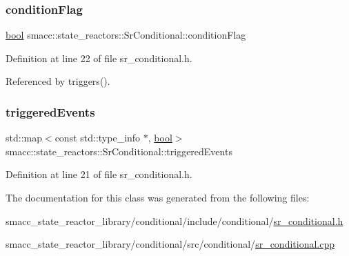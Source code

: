 \subsubsection{\texorpdfstring{condition\+Flag}{conditionFlag}}
{\footnotesize\ttfamily \hyperlink{classbool}{bool} smacc\+::state\+\_\+reactors\+::\+Sr\+Conditional\+::condition\+Flag\hspace{0.3cm}{\ttfamily [private]}}



Definition at line 22 of file sr\+\_\+conditional.\+h.



Referenced by triggers().

\mbox{\label{classsmacc_1_1state__reactors_1_1SrConditional_a6d841c624d6f6875db2ab6c6314bc3e1}} 
\subsubsection{\texorpdfstring{triggered\+Events}{triggeredEvents}}
{\footnotesize\ttfamily std\+::map$<$const std\+::type\+\_\+info $\ast$, \hyperlink{classbool}{bool}$>$ smacc\+::state\+\_\+reactors\+::\+Sr\+Conditional\+::triggered\+Events\hspace{0.3cm}{\ttfamily [private]}}



Definition at line 21 of file sr\+\_\+conditional.\+h.



The documentation for this class was generated from the following files\+:\begin{DoxyCompactItemize}
\item 
smacc\+\_\+state\+\_\+reactor\+\_\+library/conditional/include/conditional/\hyperlink{sr__conditional_8h}{sr\+\_\+conditional.\+h}\item 
smacc\+\_\+state\+\_\+reactor\+\_\+library/conditional/src/conditional/\hyperlink{sr__conditional_8cpp}{sr\+\_\+conditional.\+cpp}\end{DoxyCompactItemize}
